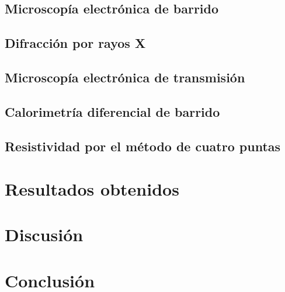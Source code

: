 \documentclass[11pt]{beamer}
\begin{document}
\subsection{Microscopía electrónica de barrido}
\subsection{Difracción por rayos X}
\subsection{Microscopía electrónica de transmisión}
\subsection{Calorimetría diferencial de barrido}
\subsection{Resistividad por el método de cuatro puntas}
\section{Resultados obtenidos}
\section{Discusión}
\section{Conclusión}
\end{document}
